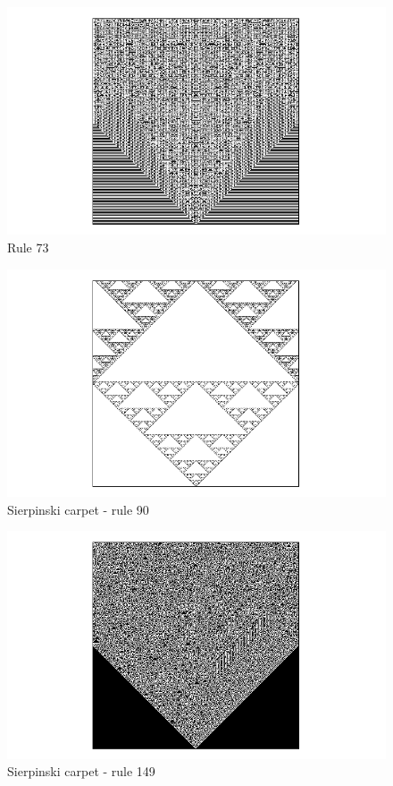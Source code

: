 \begin{figure}
 \centering
 \includegraphics[trim = 40mm 0mm 0mm 0mm, width=1.7\textwidth]{./img/73_500}
 \caption{Rule 73}
\end{figure}


\begin{figure}
 \centering
 \includegraphics[trim = 40mm 0mm 0mm 0mm, width=1.7\textwidth]{./img/90_500}
 \caption{Sierpinski carpet - rule 90}
 \label{koberec}
\end{figure}


\begin{figure}
 \centering
 \includegraphics[trim = 40mm 0mm 0mm 0mm, width=1.7\textwidth]{./img/149_500}
 \caption{Sierpinski carpet - rule 149}
 \label{koberec}
\end{figure}

